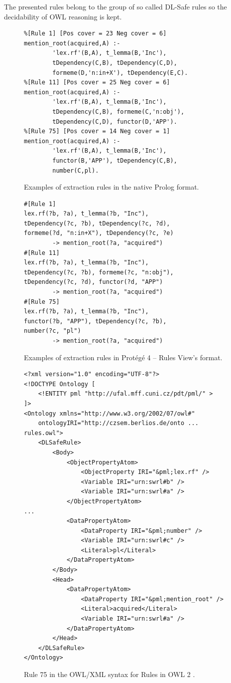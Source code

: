 The presented rules belong to the group of so called DL-Safe rules \citep{Motik:DL-Safe-rules} so the decidability of OWL reasoning is kept.




\begin{figure}
\begin{verbatim}
%[Rule 1] [Pos cover = 23 Neg cover = 6]
mention_root(acquired,A) :-
		'lex.rf'(B,A), t_lemma(B,'Inc'),
		tDependency(C,B), tDependency(C,D),
		formeme(D,'n:in+X'), tDependency(E,C).
%[Rule 11] [Pos cover = 25 Neg cover = 6]
mention_root(acquired,A) :-
		'lex.rf'(B,A), t_lemma(B,'Inc'),
		tDependency(C,B), formeme(C,'n:obj'),
		tDependency(C,D), functor(D,'APP').
%[Rule 75] [Pos cover = 14 Neg cover = 1]
mention_root(acquired,A) :-
		'lex.rf'(B,A), t_lemma(B,'Inc'),
		functor(B,'APP'), tDependency(C,B),
		number(C,pl).							
\end{verbatim}
	\caption{Examples of extraction rules in the native Prolog format.}
	\label{img:rules_prolog}
\end{figure}

\begin{figure}
\begin{verbatim}
#[Rule 1]
lex.rf(?b, ?a), t_lemma(?b, "Inc"),
tDependency(?c, ?b), tDependency(?c, ?d),
formeme(?d, "n:in+X"), tDependency(?c, ?e)
		-> mention_root(?a, "acquired")
#[Rule 11]
lex.rf(?b, ?a), t_lemma(?b, "Inc"),
tDependency(?c, ?b), formeme(?c, "n:obj"),
tDependency(?c, ?d), functor(?d, "APP")
		-> mention_root(?a, "acquired")
#[Rule 75]
lex.rf(?b, ?a), t_lemma(?b, "Inc"),
functor(?b, "APP"), tDependency(?c, ?b),
number(?c, "pl")
		-> mention_root(?a, "acquired")							
\end{verbatim}
	\caption{Examples of extraction rules in Prot\'{e}g\'{e} 4 -- Rules View's format.}
	\label{img:rules_protege}
\end{figure}

\begin{figure}
\begin{verbatim}
<?xml version="1.0" encoding="UTF-8"?>
<!DOCTYPE Ontology [
	<!ENTITY pml "http://ufal.mff.cuni.cz/pdt/pml/" >
]>
<Ontology xmlns="http://www.w3.org/2002/07/owl#"
	ontologyIRI="http://czsem.berlios.de/onto ... rules.owl">
	<DLSafeRule>
		<Body>
			<ObjectPropertyAtom>
				<ObjectProperty IRI="&pml;lex.rf" />
				<Variable IRI="urn:swrl#b" />
				<Variable IRI="urn:swrl#a" />
			</ObjectPropertyAtom>
...
			<DataPropertyAtom>
				<DataProperty IRI="&pml;number" />
				<Variable IRI="urn:swrl#c" />
				<Literal>pl</Literal>
			</DataPropertyAtom>
		</Body>
		<Head>
			<DataPropertyAtom>
				<DataProperty IRI="&pml;mention_root" />
				<Literal>acquired</Literal>
				<Variable IRI="urn:swrl#a" />
			</DataPropertyAtom>
		</Head>
	</DLSafeRule>
</Ontology>
\end{verbatim}
\caption{Rule 75 in the OWL/XML syntax for Rules in OWL 2 \citep{GHPP09a}.}
\label{img:rules_xml}
\end{figure}


